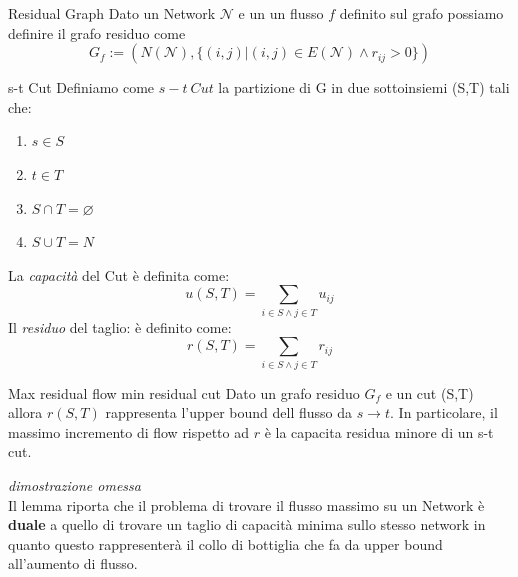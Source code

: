 \documentclass[a4paper, 11pt]{report}
\newcommand*{\mc}[1]{\mathcal{#1}}
\begin{document}
\begin{definition}{Residual Graph}{}
    Dato un Network $\mc{N}$ e un un flusso $f$ definito sul grafo possiamo definire il grafo residuo come 
    \[G_f := (N(\mc{N}), \{(i,j) | (i,j)\in E(\mc{N}) \land r_{ij} > 0\})\]
    
\end{definition}

\begin{definition}{s-t Cut}{}
    Definiamo come $s-t\ Cut$ la partizione di G in due sottoinsiemi (S,T) tali che:
    \begin{enumerate}
        \item $s \in S$
        \item $t \in T$
        \item $S \cap T = \varnothing$
        \item $S \cup T = N$
    \end{enumerate}
    
    La \textit{capacità} del Cut è definita come:
    \[u(S,T) = \sum_{i\in S\land j\in T} u_{ij}\]
    Il \textit{residuo} del taglio: è definito come:
    \[r(S,T) = \sum_{i\in S\land j\in T} r_{ij}\]
\end{definition}

\begin{lemma}{Max residual flow min residual cut}{}
    Dato un grafo residuo $G_f$ e un cut (S,T) allora $r(S,T)$ rappresenta l'upper bound dell flusso da $s \rightarrow t$.
    In particolare, il massimo incremento di flow rispetto ad $r$ è la capacita residua minore di un s-t cut.  
\end{lemma}
\textit{dimostrazione omessa}\\
Il lemma riporta che il problema di trovare il flusso massimo su un Network è \textbf{duale} a quello di trovare un taglio di capacità minima sullo stesso network in quanto questo rappresenterà il collo di bottiglia che fa da upper bound all'aumento di flusso.
\end{document}

